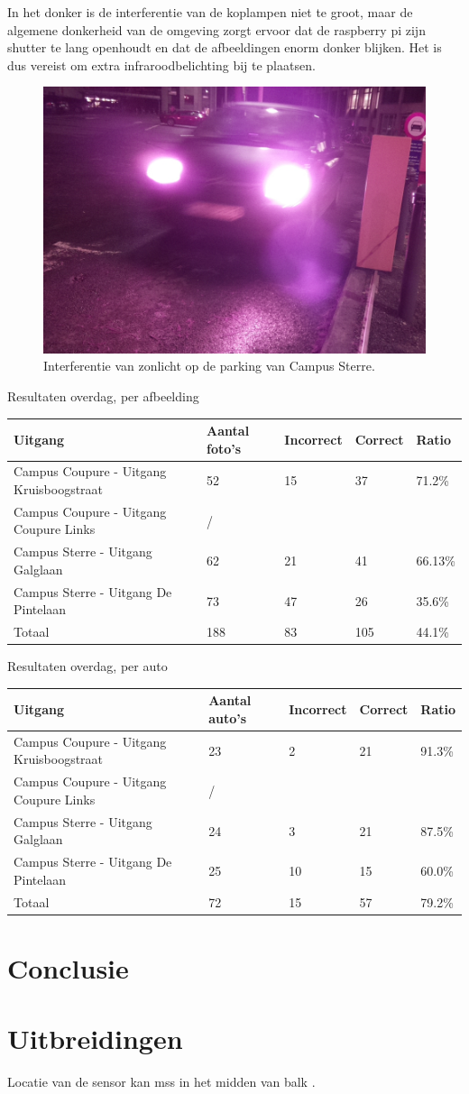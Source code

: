 In het donker is de interferentie van de koplampen niet te groot, maar de algemene donkerheid van de omgeving zorgt ervoor dat de raspberry pi zijn shutter te lang openhoudt en dat de afbeeldingen enorm donker blijken. Het is dus vereist om extra infraroodbelichting bij te plaatsen.
\begin{figure}[h!]
	\centering
	\includegraphics[width=0.5\linewidth]{img/nacht-coupure.jpg}
	\caption{Interferentie van zonlicht op de parking van Campus Sterre.}
	\label{SterreZonlicht}
\end{figure}

Resultaten overdag, per afbeelding
\begin{table}[h]
	\centering
	\begin{tabular}{l|l|l|l|l}
		Uitgang	& Aantal foto's & Incorrect	& Correct & Ratio \\ \hline
		Campus Coupure - Uitgang Kruisboogstraat &	52	& 15	& 37	&	71.2\% \\
		Campus Coupure - Uitgang Coupure Links	& / & & \\
		Campus Sterre - Uitgang Galglaan &	62	& 21	& 41 & 66.13\%\\
		Campus Sterre - Uitgang De Pintelaan	& 73	& 47	&	26	& 35.6\%\\ \hline
		Totaal & 188 & 83 & 105 & 44.1\%
	\end{tabular}
\end{table}

Resultaten overdag, per auto
\begin{table}[h]
	\centering
	\begin{tabular}{l|l|l|l|l}
		Uitgang	& Aantal auto's & Incorrect	& Correct & Ratio \\ \hline
		Campus Coupure - Uitgang Kruisboogstraat& 23 & 2	& 21 	& 91.3\% \\
		Campus Coupure - Uitgang Coupure Links	& / & &   	& 	\\
		Campus Sterre - Uitgang Galglaan		& 24 & 3	& 21 	& 87.5\%\\
		Campus Sterre - Uitgang De Pintelaan	& 25 & 10	& 15		& 60.0\%\\ \hline
		Totaal & 72 & 15 & 57 & 79.2\%
	\end{tabular}
\end{table}


\section{Conclusie}

\section{Uitbreidingen}
Locatie van de sensor kan mss in het midden van balk \autocite{buhus2016automatic}.